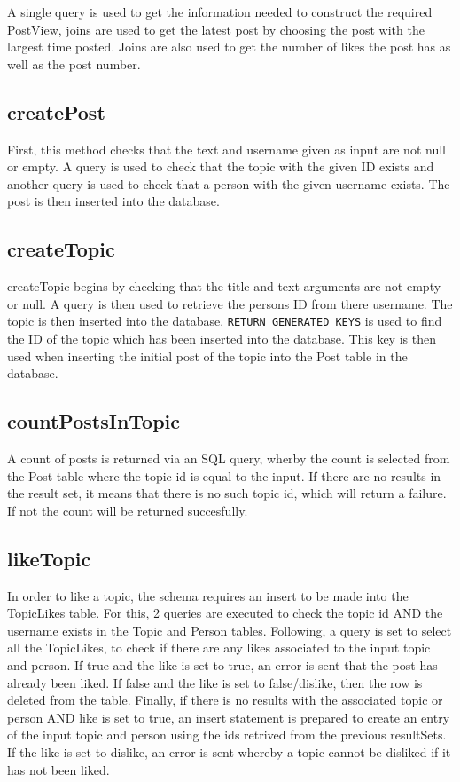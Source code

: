 \documentclass{article}
\begin{document}
A single query is used to get the information needed to construct the required PostView, joins are used to get the latest post by choosing the post with the largest time posted. Joins are also used to get the number of likes the post has as well as the post number.

\subsection*{createPost}

First, this method checks that the text and username given as input are not null or empty. A query is used to check that the topic with the given ID exists and another query is used to check that a person with the given username exists. The post is then inserted into the database.

\subsection*{createTopic}

createTopic begins by checking that the title and text arguments are not empty or null. A query is then used to retrieve the persons ID from there username. The topic is then inserted into the database. \texttt{RETURN\_GENERATED\_KEYS} is used to find the ID of the topic which has been inserted into the database. This key is then used when inserting the initial post of the topic into the Post table in the database.

\subsection*{countPostsInTopic}

A count of posts is returned via an SQL query, wherby the count is selected from the Post table where the topic id is equal to the input. If there are no results in the result set, it means that there is no such topic id, which will return a failure. If not the count will be returned succesfully.

\subsection*{likeTopic}

In order to like a topic, the schema requires an insert to be made into the TopicLikes table. For this, 2 queries are executed to check the topic id AND the username exists in the Topic and Person tables. Following, a query is set to select all the TopicLikes, to check if there are any likes associated to the input topic and person. If true and the like is set to true, an error is sent that the post has already been liked. If false and the like is set to false/dislike, then the row is deleted from the table.
Finally, if there is no results with the associated topic or person AND like is set to true, an insert statement is prepared to create an entry of the input topic and person using the ids retrived from the previous resultSets. If the like is set to dislike, an error is sent whereby a topic cannot be disliked if it has not been liked.
\end{document}
